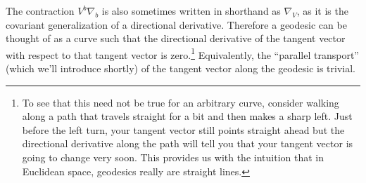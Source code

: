 The contraction $V^b \nabla_b$ is also sometimes written in shorthand as $\nabla_V$, as it is the covariant generalization of a directional derivative. Therefore a geodesic can be thought of as a curve such that the directional derivative of the tangent vector with respect to that tangent vector is zero.\footnote{To see that this need not be true for an arbitrary curve, consider walking along a path that travels straight for a bit and then makes a sharp left. Just before the left turn, your tangent vector still points straight ahead but the directional derivative along the path will tell you that your tangent vector is going to change very soon. This provides us with the intuition that in Euclidean space, geodesics really are straight lines.} Equivalently, the ``parallel transport'' (which we'll introduce shortly) of the tangent vector along the geodesic is trivial.